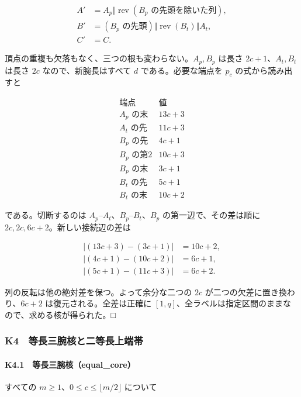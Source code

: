 \documentclass[
  10pt,
  a4paper,
]{article}
\begin{document}
\[
\begin{aligned}
A'&=A_p\Vert\operatorname{rev}(B_p\text{ の先頭を除いた列}),\\
B'&=(B_p\text{ の先頭})\Vert\operatorname{rev}(B_t)\Vert A_t,\\
C'&=C.
\end{aligned}
\]

頂点の重複も欠落もなく、三つの根も変わらない。\(A_p,B_p\) は長さ
\(2c+1\)、\(A_t,B_t\) は長さ \(2c\) なので、新腕長はすべて \(d\)
である。必要な端点を \(p_c\) の式から読み出すと

\[
\begin{array}{c|r}
\text{端点}&\text{値}\\
\hline
A_p\text{ の末}&13c+3\\
A_t\text{ の先}&11c+3\\
B_p\text{ の先}&4c+1\\
B_p\text{ の第2}&10c+3\\
B_p\text{ の末}&3c+1\\
B_t\text{ の先}&5c+1\\
B_t\text{ の末}&10c+2
\end{array}
\]

である。切断するのは \(A_p\)--\(A_t\)、\(B_p\)--\(B_t\)、\(B_p\)
の第一辺で、その差は順に \(2c,2c,6c+2\)。新しい接続辺の差は

\[
\begin{aligned}
|(13c+3)-(3c+1)|&=10c+2,\\
|(4c+1)-(10c+2)|&=6c+1,\\
|(5c+1)-(11c+3)|&=6c+2.
\end{aligned}
\]

列の反転は他の絶対差を保つ。よって余分な二つの \(2c\)
が二つの欠差に置き換わり、\(6c+2\) は復元される。全差は正確に
\([1,q]\)、全ラベルは指定区間のままなので、求める核が得られた。□

\subsubsection{K4　等長三腕核と二等長上端帯}\label{k4-ux7b49ux9577ux4e09ux8155ux6838ux3068ux4e8cux7b49ux9577ux4e0aux7aefux5e2f}

\paragraph{K4.1　等長三腕核（equal\_core）}\label{k4.1-ux7b49ux9577ux4e09ux8155ux6838equal_core}

すべての \(m\ge1\)、\(0\le c\le\lfloor m/2\rfloor\) について
\end{document}
